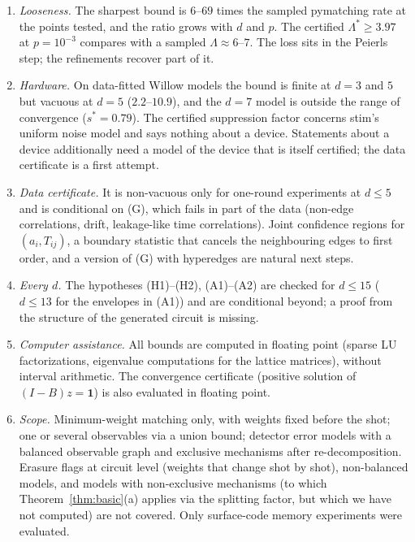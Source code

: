 \documentclass[11pt]{article}
\theoremstyle{plain}
\theoremstyle{definition}
\theoremstyle{remark}
\newcommand{\one}{\mathbf 1}
\renewcommand{\_}{\oldunderscore\allowbreak}
\begin{document}
\begin{enumerate}[leftmargin=*,itemsep=2pt]
\item \emph{Looseness.} The sharpest bound is $6$--$69$ times the sampled pymatching rate at the points tested, and the ratio grows with $d$ and $p$. The certified $\Lambda^\ast\ge3.97$ at $p=10^{-3}$ compares with a sampled $\Lambda\approx6$--$7$. The loss sits in the Peierls step; the refinements recover part of it.
\item \emph{Hardware.} On data-fitted Willow models the bound is finite at $d=3$ and $5$ but vacuous at $d=5$ ($2.2$--$10.9$), and the $d=7$ model is outside the range of convergence ($s^\ast=0.79$). The certified suppression factor concerns stim's uniform noise model and says nothing about a device. Statements about a device additionally need a model of the device that is itself certified; the data certificate is a first attempt.
\item \emph{Data certificate.} It is non-vacuous only for one-round experiments at $d\le5$ and is conditional on (G), which fails in part of the data (non-edge correlations, drift, leakage-like time correlations). Joint confidence regions for $(a_i,T_{ij})$, a boundary statistic that cancels the neighbouring edges to first order, and a version of (G) with hyperedges are natural next steps.
\item \emph{Every $d$.} The hypotheses (H1)--(H2), (A1)--(A2) are checked for $d\le15$ ($d\le13$ for the envelopes in (A1)) and are conditional beyond; a proof from the structure of the generated circuit is missing.
\item \emph{Computer assistance.} All bounds are computed in floating point (sparse LU factorizations, eigenvalue computations for the lattice matrices), without interval arithmetic. The convergence certificate (positive solution of $(I-B)z=\one$) is also evaluated in floating point.
\item \emph{Scope.} Minimum-weight matching only, with weights fixed before the shot; one or several observables via a union bound; detector error models with a balanced observable graph and exclusive mechanisms after re-decomposition. Erasure flags at circuit level (weights that change shot by shot), non-balanced models, and models with non-exclusive mechanisms (to which Theorem~\ref{thm:basic}(a) applies via the splitting factor, but which we have not computed) are not covered. Only surface-code memory experiments were evaluated.
\end{enumerate}
\end{document}
